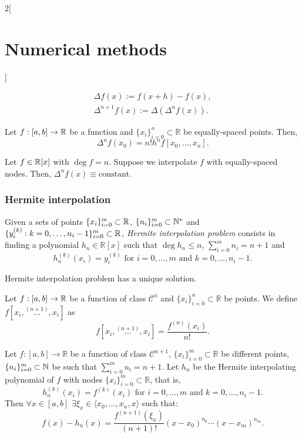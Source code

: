 \documentclass[../../../main.tex]{subfiles}
\begin{document}
\begin{multicols}{2}[\section{Numerical methods}]
\begin{definition}
    \begin{gather*}
        \Delta f(x):=f(x+h)-f(x),\\
        \Delta^{n+1}f(x):=\Delta(\Delta^nf(x)).
    \end{gather*}
\end{definition}
\begin{lemma}
    Let $f:[a,b]\rightarrow\mathbb{R}$ be a function and $\{x_i\}_{i=0}^n\subset\mathbb{R}$ be equally-spaced points. Then, $$\Delta^nf(x_0)=n!h^nf[x_0,\ldots,x_n].$$
\end{lemma}
\begin{corollary}
    Let $f\in\mathbb{R}[x]$ with $\deg f=n$. Suppose we interpolate $f$ with equally-spaced nodes. Then, $\Delta^nf(x)\equiv\text{constant}$.
\end{corollary}
\subsubsection{Hermite interpolation}
\begin{definition}
    Given a sets of points $\{x_i\}_{i=0}^m\subset\mathbb{R}$, $\{n_i\}_{i=0}^m\subset\mathbb{N}^*$ and $\{y_i^{(k)}:k=0,\ldots,n_i-1\}_{i=0}^m\subset\mathbb{R}$, \textit{Hermite interpolation problem} consists in finding a polynomial $h_n\in\mathbb{R}[x]$ such that $\deg h_n\leq n$, $\sum_{i=0}^mn_i=n+1$ and $$h_n^{(k)}(x_i)=y_i^{(k)}\text{ for }i=0,\ldots,m\text{ and }k=0,\ldots,n_i-1.$$
\end{definition}
\begin{prop}
    Hermite interpolation problem has a unique solution.
\end{prop}
\begin{prop}
    Let $f:[a,b]\rightarrow\mathbb{R}$ be a function of class $\mathcal{C}^n$ and $\{x_i\}_{i=0}^n\subset\mathbb{R}$ be points. We define $f[x_i,\overset{(n+1)}{\ldots},x_i]$ as $$f[x_i,\overset{(n+1)}{\ldots},x_i]=\frac{f^{(n)}(x_i)}{n!}.$$
\end{prop}
\begin{theorem}
    Let $f:[a,b]\rightarrow\mathbb{R}$ be a function of class $\mathcal{C}^{n+1}$, $\{x_i\}_{i=0}^m\subset\mathbb{R}$ be different points, $\{n_i\}_{i=0}^m\subset\mathbb{N}$ be such that $\sum_{i=0}^mn_i=n+1$. Let $h_n$ be the Hermite interpolating polynomial of $f$ with nodes $\{x_i\}_{i=0}^m\subset\mathbb{R}$, that is, $$h_n^{(k)}(x_i)=f^{(k)}(x_i)\text{ for }i=0,\ldots,m\text{ and }k=0,\ldots,n_i-1.$$ Then $\forall x\in[a,b]$ $\exists\xi_x\in\langle x_0,\ldots,x_n,x\rangle$ such that: $$f(x)-h_n(x)=\frac{f^{(n+1)}(\xi_x)}{(n+1)!}(x-x_0)^{n_0}\cdots(x-x_m)^{n_m}.$$
\end{theorem}

\end{multicols}
\end{document}
